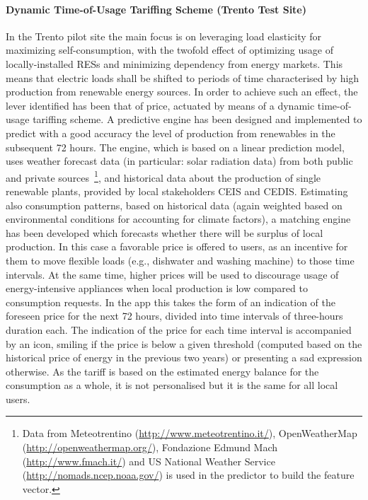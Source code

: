 \paragraph{Dynamic Time-of-Usage Tariffing Scheme (Trento Test Site)}
In the Trento pilot site the main focus is on leveraging load elasticity for maximizing self-consumption, with the twofold effect of optimizing usage of locally-installed RESs and minimizing dependency from energy markets. This means that electric loads shall be shifted to periods of time characterised by high production from renewable energy sources. In order to achieve such an effect, the lever identified has been that of price, actuated by means of a dynamic time-of-usage tariffing scheme. A predictive engine has been designed and implemented to predict with a good accuracy the level of production from renewables in the subsequent 72 hours. The engine, which is based on a linear prediction model, uses weather forecast data (in particular: solar radiation data) from both public and private sources~\footnote{Data from Meteotrentino (\url{http://www.meteotrentino.it/}), OpenWeatherMap (\url{http://openweathermap.org/}), Fondazione Edmund Mach (\url{http://www.fmach.it/}) and US National Weather Service (\url{http://nomads.ncep.noaa.gov/}) is used in the predictor to build the feature vector.}, and historical data about the production of single renewable plants, provided by local stakeholders CEIS and CEDIS.
Estimating also consumption patterns, based on historical data (again weighted based on environmental conditions for accounting for climate factors), a matching engine has been developed which forecasts whether there will be surplus of local production. In this case a favorable price is offered to users, as an incentive for them to move flexible loads (e.g., dishwater and washing machine) to those time intervals. At the same time, higher prices will be used to discourage usage of energy-intensive appliances when local production is low compared to consumption requests. In the app this takes the form of an indication of the foreseen price for the next 72 hours, divided into time intervals of three-hours duration each. The indication of the price for each time interval is accompanied by an icon, smiling if the price is below a given threshold (computed based on the historical price of energy in the previous two years) or presenting a sad expression otherwise. As the tariff is based on the estimated energy balance for the consumption as a whole, it is not personalised but it is the same for all local users.

